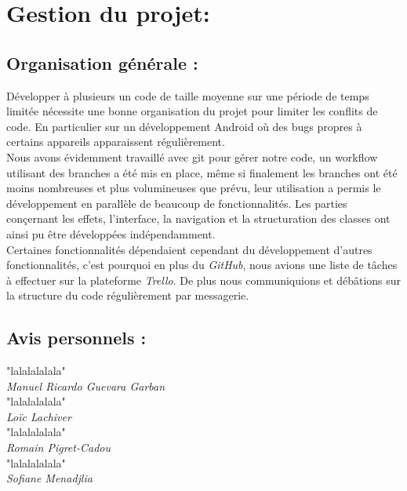 \section{Gestion du projet:}

\subsection{Organisation générale :}
Développer à plusieurs un code de taille moyenne sur une période de temps limitée nécessite une bonne organisation du projet pour limiter les conflits de code. En particulier sur un développement Android où des bugs propres à certains appareils apparaissent régulièrement.
\\

Nous avons évidemment travaillé avec git pour gérer notre code, un workflow utilisant des branches a été mis en place, même si finalement les branches ont été moins nombreuses et plus volumineuses que prévu, leur utilisation a permis le développement en parallèle de beaucoup de fonctionnalités. Les parties conçernant les effets, l'interface, la navigation et la structuration des classes ont ainsi pu être développées indépendamment.
\\
Certaines fonctionnalités dépendaient cependant du développement d'autres fonctionnalités, c'est pourquoi en plus du \textit{GitHub}, nous avions une liste de tâches à effectuer sur la plateforme \textit{Trello}. De plus nous communiquions et débâtions sur la structure du code régulièrement par messagerie.


\subsection{Avis personnels :}

"lalalalalala"
\\
\textit{Manuel Ricardo Guevara Garban}\\

"lalalalalala"
\\
\textit{Loïc Lachiver}\\

"lalalalalala"
\\
\textit{Romain Pigret-Cadou}\\

"lalalalalala"
\\
\textit{Sofiane Menadjlia}